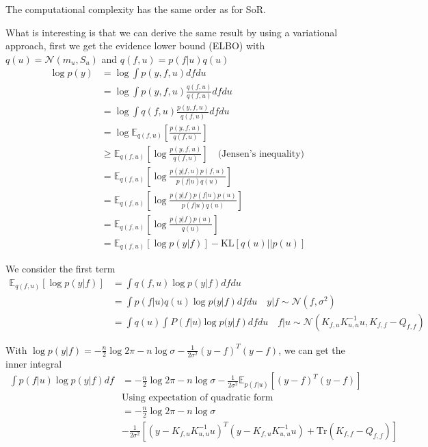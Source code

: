 \documentclass[10pt]{elegantbook}
\begin{document}
The computational complexity has the same order as for SoR.

What is interesting is that we can derive the same result by using a variational approach, first we get the evidence lower bound (ELBO) with $q(u) = \mathcal N(m_u, S_u)$
and $q(f, u) = p(f|u)q(u)$
\begin{equation}
    \begin{aligned}
        \log p(y) &= \log \int p(y, f, u) df du \\
        &= \log \int p(y, f, u) \frac{q(f, u)}{q(f, u)} df du \\
        &= \log \int q(f, u) \frac{p(y, f, u)}{q(f, u)} df du \\
        &= \log \mathbb E_{q(f, u)} \left [ \frac{p(y, f, u)}{q(f, u)} \right ] \\
        &\geq \mathbb E_{q(f, u)} \left [ \log \frac{p(y, f, u)}{q(f, u)} \right ] \quad \text{(Jensen's inequality)} \\
        &= \mathbb E_{q(f, u)} \left [ \log \frac{p(y|f, u)p(f, u)}{p(f|u)q(u)} \right ] \\
        &= \mathbb E_{q(f, u)} \left [ \log \frac{p(y|f)p(f|u)p(u)}{p(f|u)q(u)} \right ] \\
        &= \mathbb E_{q(f, u)} \left [ \log \frac{p(y|f)p(u)}{q(u)} \right ] \\
        &= \mathbb E_{q(f, u)} \left [ \log p(y|f) \right ] - \text{KL} \left [q(u) || p(u) \right ]
    \end{aligned}
\end{equation}

We consider the first term
\begin{equation}
    \begin{aligned}
        \mathbb E_{q(f, u)} \left [ \log p(y|f) \right ] &= \int q(f, u) \log p(y|f) df du \\
        &= \int p(f|u) q(u) \log p(y|f) df du \quad y|f \sim \mathcal N(f, \sigma^2) \\
        &= \int q(u) \int P(f|u) \log p(y|f) df du \quad f|u \sim \mathcal N(K_{f, u}K_{u, u}^{-1}u, K_{f, f} - Q_{f, f})
    \end{aligned}
\end{equation}

With $\log p(y|f) = -\frac{n}{2} \log 2\pi - n \log \sigma - \frac{1}{2\sigma^2} (y-f)^T(y-f)$, we can get the inner integral
\begin{equation}
    \begin{aligned}
        \int p(f|u) \log p(y|f) df &= -\frac{n}{2} \log 2\pi - n \log \sigma - \frac{1}{2\sigma^2} \mathbb E_{p(f|u)} \left [ (y-f)^T(y-f) \right ] \\
        & \text{Using expectation of quadratic form} \\
        &= -\frac{n}{2} \log 2\pi - n \log \sigma \\
        &- \frac{1}{2\sigma^2} \left [ (y - K_{f, u}K_{u, u}^{-1}u)^T(y - K_{f, u}K_{u, u}^{-1}u) + \text{Tr}(K_{f, f} - Q_{f, f}) \right ] \\
    \end{aligned}
\end{equation}
\end{document}
